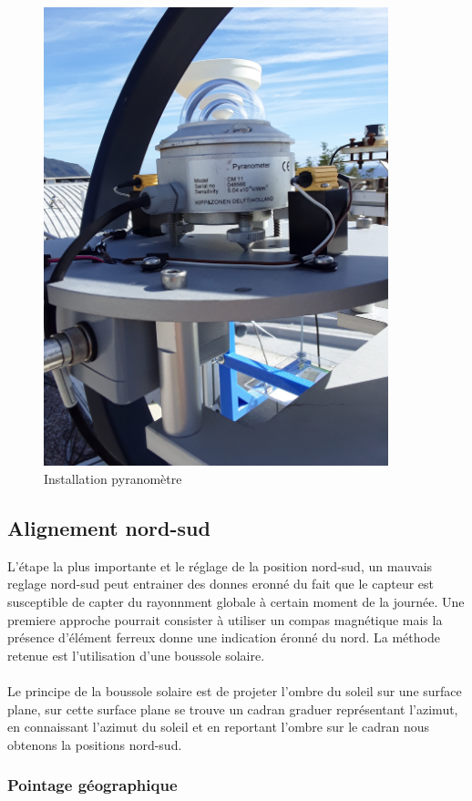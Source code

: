 \documentclass[12pt,a4paper]{article}
\begin{document}
\begin{flushleft}
\begin{figure}[H]
\centering
\includegraphics[width=10cm, angle=-90]{image/montage/4.jpg} 
\caption{Installation pyranomètre}
\end{figure}

\subsection{Alignement nord-sud}

L'étape la plus importante et le réglage de la position nord-sud, un mauvais reglage nord-sud peut entrainer des donnes eronné du fait que le capteur est susceptible de capter du rayonnment globale à certain moment de la journée. Une premiere approche pourrait consister à utiliser un compas magnétique mais la présence d'élément ferreux donne une indication éronné du nord. La méthode retenue est l'utilisation d'une boussole solaire.\\
~~\\
Le principe de la boussole solaire est de projeter l'ombre du soleil sur une surface plane, sur cette surface plane se trouve un cadran graduer représentant l'azimut, en connaissant l'azimut du soleil et en reportant l'ombre sur le cadran nous obtenons la positions nord-sud.\\

\subsubsection{Pointage géographique}


\end{flushleft}
\end{document}
